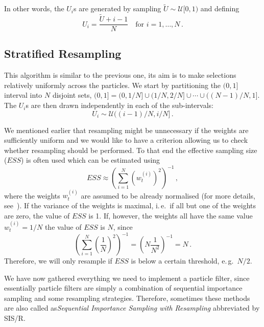 In other words, the $U_i$s are generated by sampling
$\tilde{U} \sim \mathcal{U}[0, 1)$ and defining
\[
  U_i = \frac{\tilde{U} + i-1}{N} \quad \text{for } i = 1, \dotsc, N
  \,.
\]

\subsection*{Stratified Resampling}
This algorithm is similar to the previous one, its aim is to make
selections relatively uniformly across the particles. We start by
partitioning the $(0,1]$ interval into $N$ disjoint sets,
$(0,1] = (0, 1/N] \cup (1/N, 2/N] \cup \dotsm \cup ((N-1)/N, 1]$. The
$U_i$s are then drawn independently in each of the sub-intervals:
\[
  U_i \sim \mathcal{U}((i-1)/N, i/N]\,.
\]

We mentioned earlier that resampling might be unnecessary if the
weights are sufficiently uniform and we would like to have a criterion
allowing us to check whether resampling should be performed. To that
end the effective sampling size ($ESS$) is often used which can be
estimated using
\begin{equation}
  \label{eq:ESS}
  ESS \approx {\left( \sum_{i=1}^N {\left( w_t^{(i)} \right)}^2
    \right)}^{-1} \,,
\end{equation}
where the weights $w_t^{(i)}$ are assumed to be already normalised
(for more details, see~\cite[179]{arulampalam}). If the variance of
the weights is maximal, i.\,e.\ if all but one of the weights are
zero, the value of $ESS$ is 1. If, however, the weights all have the
same value $w_t^{(i)} = 1/N$ the value of $ESS$ is $N$, since
\[
  {\left( \sum_{i=1}^N {\left( \frac{1}{N} \right)}^2 \right)}^{-1} =
  {\left( N \frac{1}{N^2} \right)}^{-1} = N \,.
\]
Therefore, we will only resample if $ESS$ is below a certain
threshold, e.\,g.\ $N/2$.

We have now gathered everything we need to implement a particle
filter, since essentially particle filters are simply a combination of
sequential importance sampling and some resampling
strategies. Therefore, sometimes these methods are also called
as\emph{Sequential Importance Sampling with Resampling} abbreviated by
SIS/R.
